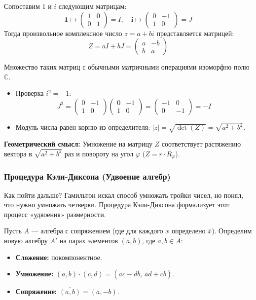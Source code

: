 \documentclass[11pt, a4paper]{extarticle}
\newcommand{\ph}{\varphi}
\newcommand{\C}{{\mathbb C}}
\renewcommand{\bar}[1]{\overline{#1}}
\begin{document}
\begin{definition}[Матричная модель $\C$]
Сопоставим $1$ и $i$ следующим матрицам:
$$ \mathbf{1} \mapsto \begin{pmatrix} 1 & 0 \\ 0 & 1 \end{pmatrix} = I, \quad \mathbf{i} \mapsto \begin{pmatrix} 0 & -1 \\ 1 & 0 \end{pmatrix} = J $$
Тогда произвольное комплексное число $z = a + bi$ представляется матрицей:
$$ Z = aI + bJ = \begin{pmatrix} a & -b \\ b & a \end{pmatrix} $$
\end{definition}

\begin{theorem}[Изоморфизм]
Множество таких матриц с обычными матричными операциями изоморфно полю $\C$.
\begin{itemize}
    \item Проверка $i^2 = -1$:
    $$ J^2 = \begin{pmatrix} 0 & -1 \\ 1 & 0 \end{pmatrix} \begin{pmatrix} 0 & -1 \\ 1 & 0 \end{pmatrix} = \begin{pmatrix} -1 & 0 \\ 0 & -1 \end{pmatrix} = -I $$
    \item Модуль числа равен корню из определителя: $|z| = \sqrt{\det(Z)} = \sqrt{a^2 + b^2}$.
\end{itemize}
\textbf{Геометрический смысл:} Умножение на матрицу $Z$ соответствует растяжению вектора в $\sqrt{a^2+b^2}$ раз и повороту на угол $\ph$ ($Z = r \cdot R_\ph$).
\end{theorem}

\subsubsection{Процедура Кэли-Диксона (Удвоение алгебр)}

Как пойти дальше? Гамильтон искал способ умножать тройки чисел, но понял, что нужно умножать четверки. Процедура Кэли-Диксона формализует этот процесс «удвоения» размерности.

\begin{definition}[Удвоение]
Пусть $A$ — алгебра с сопряжением (где для каждого $x$ определено $\bar{x}$).
Определим новую алгебру $A'$ на парах элементов $(a, b)$, где $a, b \in A$:
\begin{itemize}
    \item \textbf{Сложение:} покомпонентное.
    \item \textbf{Умножение:} $(a, b) \cdot (c, d) = (ac - d\bar{b}, \, \bar{a}d + cb)$.
    \item \textbf{Сопряжение:} $\overline{(a, b)} = (\bar{a}, -b)$.
\end{itemize}
\end{definition}
\end{document}
